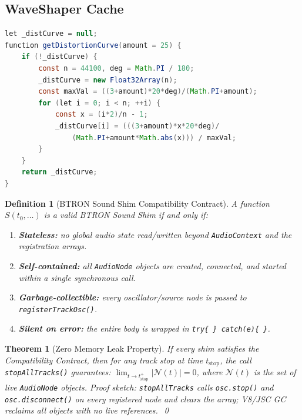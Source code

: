 \documentclass[10pt,journal,compsoc,twocolumn]{article}
\newtheorem{definition}{Definition}
\newtheorem{theorem}{Theorem}
\begin{document}
\subsection{WaveShaper Cache}

\begin{lstlisting}[language=Java,
    caption={\texttt{getDistortionCurve} — cached Chebyshev WaveShaper (line 3715).}]
let _distCurve = null;
function getDistortionCurve(amount = 25) {
    if (!_distCurve) {
        const n = 44100, deg = Math.PI / 180;
        _distCurve = new Float32Array(n);
        const maxVal = ((3+amount)*20*deg)/(Math.PI+amount);
        for (let i = 0; i < n; ++i) {
            const x = (i*2)/n - 1;
            _distCurve[i] = (((3+amount)*x*20*deg)/
                (Math.PI+amount*Math.abs(x))) / maxVal;
        }
    }
    return _distCurve;
}
\end{lstlisting}

\begin{definition}[BTRON Sound Shim Compatibility Contract]
A function $S(t_0, \ldots)$ is a valid BTRON Sound Shim if and only if:
\begin{enumerate}[leftmargin=*]
    \item \textbf{Stateless:} no global audio state read/written beyond
    \texttt{AudioContext} and the registration arrays.
    \item \textbf{Self-contained:} all \texttt{AudioNode} objects are created,
    connected, and started within a single synchronous call.
    \item \textbf{Garbage-collectible:} every oscillator/source node is passed
    to \texttt{registerTrackOsc()}.
    \item \textbf{Silent on error:} the entire body is wrapped in
    \texttt{try\{~\}\,catch(e)\{~\}}.
\end{enumerate}
\end{definition}

\begin{theorem}[Zero Memory Leak Property]
If every shim satisfies the Compatibility Contract, then for any track stop at
time $t_{\mathrm{stop}}$, the call \texttt{stopAllTracks()} guarantees:
$\lim_{t \to t_{\mathrm{stop}}^+} |\mathcal{N}(t)| = 0$,
where $\mathcal{N}(t)$ is the set of live \texttt{AudioNode} objects.
\emph{Proof sketch:} \texttt{stopAllTracks} calls \texttt{osc.stop()} and
\texttt{osc.disconnect()} on every registered node and clears the array;
V8/JSC GC reclaims all objects with no live references.~\qed
\end{theorem}
\end{document}

